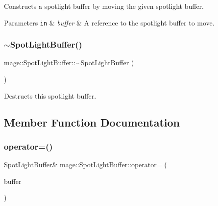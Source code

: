 Constructs a spotlight buffer by moving the given spotlight buffer.


\begin{DoxyParams}[1]{Parameters}
\mbox{\tt in}  & {\em buffer} & A reference to the spotlight buffer to move. \\
\hline
\end{DoxyParams}
\hypertarget{structmage_1_1_spot_light_buffer_aabbc92532299057fb4d649b1a9bcc605}{}\label{structmage_1_1_spot_light_buffer_aabbc92532299057fb4d649b1a9bcc605} 
\subsubsection{\texorpdfstring{$\sim$\+Spot\+Light\+Buffer()}{~SpotLightBuffer()}}
{\footnotesize\ttfamily mage\+::\+Spot\+Light\+Buffer\+::$\sim$\+Spot\+Light\+Buffer (\begin{DoxyParamCaption}{ }\end{DoxyParamCaption})\hspace{0.3cm}{\ttfamily [default]}}

Destructs this spotlight buffer. 

\subsection{Member Function Documentation}
\hypertarget{structmage_1_1_spot_light_buffer_ac2655ea3a51554f3c1b5e71afbc737b2}{}\label{structmage_1_1_spot_light_buffer_ac2655ea3a51554f3c1b5e71afbc737b2} 
\subsubsection{\texorpdfstring{operator=()}{operator=()}\hspace{0.1cm}{\footnotesize\ttfamily [1/2]}}
{\footnotesize\ttfamily \hyperlink{structmage_1_1_spot_light_buffer}{Spot\+Light\+Buffer}\& mage\+::\+Spot\+Light\+Buffer\+::operator= (\begin{DoxyParamCaption}\item[{const \hyperlink{structmage_1_1_spot_light_buffer}{Spot\+Light\+Buffer} \&}]{buffer }\end{DoxyParamCaption})\hspace{0.3cm}{\ttfamily [default]}}

